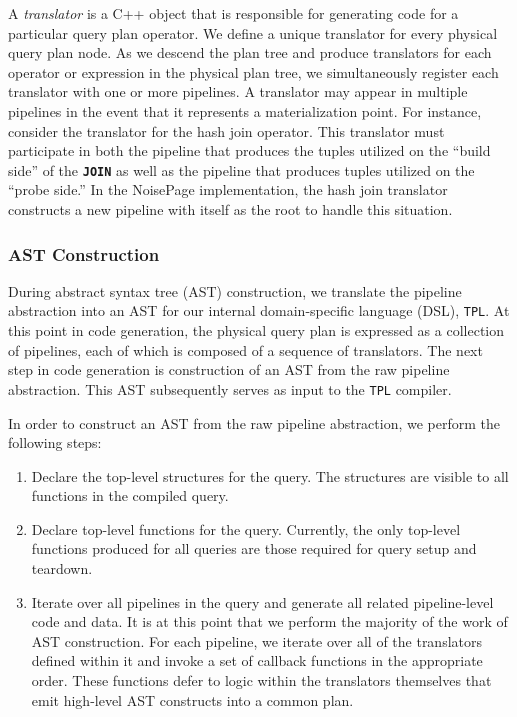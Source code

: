 \documentclass{vldb}
\newcommand{\dbSQL}[1]{\texttt{\textbf{#1}}\xspace}
\newcommand{\tpl}{\texttt{TPL}\xspace}
\begin{document}
A \textit{translator} is a C++ object that is responsible for generating code for a particular query plan operator. We define a unique translator for every physical query plan node. As we descend the plan tree and produce translators for each operator or expression in the physical plan tree, we simultaneously register each translator with one or more pipelines. A translator may appear in multiple pipelines in the event that it represents a materialization point. For instance, consider the translator for the hash join operator. This translator must participate in both the pipeline that produces the tuples utilized on the ``build side'' of the \dbSQL{JOIN} as well as the pipeline that produces tuples utilized on the ``probe side.'' In the NoisePage implementation, the hash join translator constructs a new pipeline with itself as the root to handle this situation.

\subsubsection{AST Construction}

During abstract syntax tree (AST) construction, we translate the pipeline abstraction into an AST for our internal domain-specific language (DSL), \tpl. At this point in code generation, the physical query plan is expressed as a collection of pipelines, each of which is composed of a sequence of translators. The next step in code generation is construction of an AST from the raw pipeline abstraction. This AST subsequently serves as input to the \tpl compiler.

In order to construct an AST from the raw pipeline abstraction, we perform the following steps:

\begin{enumerate}
    \item Declare the top-level structures for the query. The structures are visible to all functions in the compiled query.
    \item Declare top-level functions for the query. Currently, the only top-level functions produced for all queries are those required for query setup and teardown.
    \item Iterate over all pipelines in the query and generate all related pipeline-level code and data. It is at this point that we perform the majority of the work of AST construction. For each pipeline, we iterate over all of the translators defined within it and invoke a set of callback functions in the appropriate order. These functions defer to logic within the translators themselves that emit high-level AST constructs into a common plan.
\end{enumerate}
\end{document}
